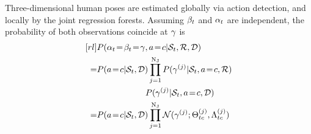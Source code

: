 Three-dimensional human poses are estimated globally via action detection, and locally by the joint regression forests. 
Assuming $\mathbf{\beta}_{t}$ and $\mathbf{\alpha}_{t}$ are independent, 
the probability of both observations coincide at $\mathbf{\gamma}$ is 
\begin{equation}
	\label{eq:combination}
	\begin{aligned}[rl] 
		& P( \posead_{\timenow}\!=\!\posepr_{\timenow}\!=\!\posez, \action\!=\!c| \snippetnow, \forestr, \forestd)\\ 
		= & P(\action\!=\!c | \snippetnow, \forestd) \prod_{j = 1}^{\njoints} P( \posez^{(j)} | \snippetnow, \action\!=\!c, \forestr) \\
			 & \hspace{20mm} P( \posez^{(j)}  | \snippetnow, \action\!=\!c, \forestd) \\
		= &  P(\action\!=\!c | \snippetnow, \forestd) \prod_{j = 1}^{\njoints} \normdist(\posez^{(j)}; \finalpose^{(j)}_{\timenow c}, \finalvariance^{(j)}_{\timenow c})
	\end{aligned}
\end{equation} 
